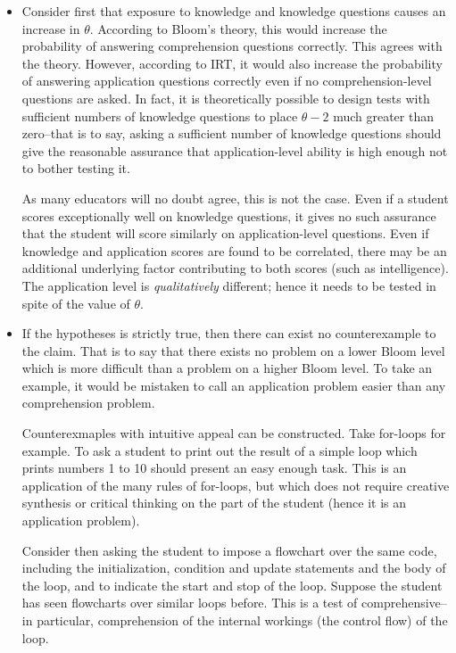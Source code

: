 \documentclass[a4paper,twocolumn]{article}
\begin{document}
\begin{itemize} 

\item Consider first that exposure to knowledge and knowledge questions causes
an increase in $\theta$.  According to Bloom's theory, this would increase the
probability of answering comprehension questions correctly.  This agrees with
the theory.  However, according to IRT, it would also increase the probability
of answering application questions correctly even if no comprehension-level
questions are asked.  In fact, it is theoretically possible to design tests
with sufficient numbers of knowledge questions to place $\theta-2$ much greater
than zero--that is to say, asking a sufficient number of knowledge questions
should give the reasonable assurance that application-level ability is high
enough not to bother testing it.

As many educators will no doubt agree, this is not the case. Even if a student
scores exceptionally well on knowledge questions, it gives no such assurance
that the student will score similarly on application-level questions.  Even if
knowledge and application scores are found to be correlated, there may be an
additional underlying factor contributing to both scores (such as
intelligence).  The application level is \emph{qualitatively} different; hence
it needs to be tested in spite of the value of $\theta$.


\item If the hypotheses is strictly true, then there can exist no
counterexample to the claim.  That is to say that there exists no problem on a
lower Bloom level which is more difficult than a problem on a higher Bloom
level.  To take an example, it would be mistaken to call an application problem
easier than any comprehension problem. 

Counterexmaples with intuitive appeal can be constructed.  Take for-loops for
example.  To ask a student to print out the result of a simple loop which
prints numbers 1 to 10 should present an easy enough task.  This is an
application of the many rules of for-loops, but which does not require creative
synthesis or critical thinking on the part of the student (hence it is an
application problem). 

Consider then asking the student to impose a flowchart over the same code,
including the initialization, condition and update statements and the body of
the loop, and to indicate the start and stop of the loop.  Suppose the student
has seen flowcharts over similar loops before.  This is a test of
comprehensive--in particular, comprehension of the internal workings (the
control flow) of the loop.    


\end{itemize}
\end{document}
